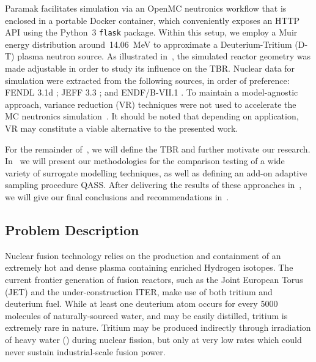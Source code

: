 Paramak facilitates simulation via an OpenMC neutronics workflow that is enclosed in
a portable Docker container, which conveniently exposes an HTTP API using the
Python~3 \texttt{flask} package. Within this setup, we employ a Muir energy distribution \cite{openmcmuir}\footnotemark[1]
around~\SI{14.06}{\mega\electronvolt} to approximate a Deuterium-Tritium (D-T)
plasma neutron source. As illustrated in~, the simulated reactor
geometry was made adjustable in order to study its influence on the TBR. Nuclear data for simulation were extracted from the following sources, in order of preference: FENDL 3.1d \cite{fendl31d}; JEFF 3.3 \cite{jeff33}; and ENDF/B-VII.1 \cite{2011ii}.
To maintain a model-agnostic approach, variance reduction (VR) techniques
were not used to accelerate the MC neutronics simulation~\cite{Kleijnen2013}.
It should be noted that depending on application, VR may constitute a viable
alternative to the presented work.

For the remainder of~, we will define the TBR and further motivate our
research. In~ we will present our methodologies for the comparison
testing of a wide variety of surrogate modelling techniques, as well as defining an add-on adaptive sampling procedure QASS. After delivering the
results of these approaches in~, we will give our final conclusions and
recommendations in~.



\subsection{Problem Description}
\label{sec:problemdescription}

Nuclear fusion technology relies on the production and containment of an
extremely hot and dense plasma containing enriched Hydrogen isotopes. The current frontier generation of fusion reactors, such as the Joint European Torus (JET) and the
under-construction ITER, make
use of both tritium and deuterium fuel. While at least one deuterium atom occurs for every \num{5000} molecules of naturally-sourced water, and may be easily distilled, tritium is extremely rare in nature. Tritium may be produced indirectly through irradiation of heavy water
(\DDO) during nuclear fission, but only at very low rates which could
never sustain industrial-scale fusion power.

